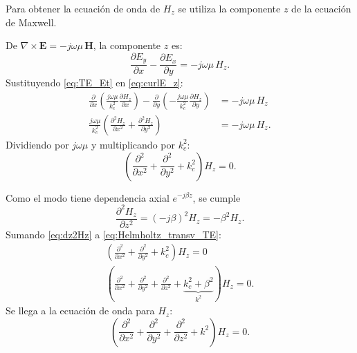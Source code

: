 \documentclass[
  11pt,
  letterpaper,
   addpoints,
   answers
  ]{exam}
\begin{document}
\begin{questions}
\begin{parts}
\begin{solution}
Para obtener la ecuación de onda de $H_z$ se utiliza la componente $z$ de la ecuación de Maxwell.

\noindent
\begin{minipage}[t]{0.48\linewidth}
De $\nabla\times \mathbf{E}=-j\omega\mu\,\mathbf{H}$, la componente $z$ es:
\begin{equation}
\frac{\partial E_y}{\partial x}-\frac{\partial E_x}{\partial y}=-j\omega\mu\,H_z.
\label{eq:curlE_z}
\end{equation}
Sustituyendo \eqref{eq:TE_Et} en \eqref{eq:curlE_z}:
\begin{align}
\frac{\partial}{\partial x}\!\left(\frac{j\omega\mu}{k_c^2}\frac{\partial H_z}{\partial x}\right)
-\frac{\partial}{\partial y}\!\left(-\frac{j\omega\mu}{k_c^2}\frac{\partial H_z}{\partial y}\right)
&=-j\omega\mu\,H_z \nonumber\\[4pt]
\frac{j\omega\mu}{k_c^2}\left(\frac{\partial^2 H_z}{\partial x^2}+\frac{\partial^2 H_z}{\partial y^2}\right)
&=-j\omega\mu\,H_z. \nonumber
\end{align}
Dividiendo por $j\omega\mu$ y multiplicando por $k_c^2$:
\begin{equation}
\left(\frac{\partial^2}{\partial x^2}+\frac{\partial^2}{\partial y^2}+k_c^2\right)H_z=0.
\label{eq:Helmholtz_transv_TE}
\end{equation}
\end{minipage}%
\hfill
\begin{minipage}[t]{0.48\linewidth}
Como el modo tiene dependencia axial $e^{-j\beta z}$, se cumple
\begin{equation}
\frac{\partial^2 H_z}{\partial z^2} = (-j\beta)^2 H_z = -\beta^2 H_z.
\label{eq:dz2Hz}
\end{equation}
Sumando \eqref{eq:dz2Hz} a \eqref{eq:Helmholtz_transv_TE}:
\begin{align}
\left(\frac{\partial^2}{\partial x^2}+\frac{\partial^2}{\partial y^2}+k_c^2\right)H_z=0\\
\left(\frac{\partial^2}{\partial x^2}+\frac{\partial^2}{\partial y^2}+\frac{\partial^2}{\partial z^2}
+\underbrace{k_c^2+\beta^2}_{k^{2}}\right)H_z=0. \nonumber
\end{align}
Se llega a la ecuación de onda para $H_z$:
\begin{equation}
\left(\frac{\partial^2}{\partial x^2}+\frac{\partial^2}{\partial y^2}+\frac{\partial^2}{\partial z^2}+k^2\right)H_z=0.
\end{equation}
\end{minipage}
\end{solution}

\end{parts}
\end{questions}
\end{document}
